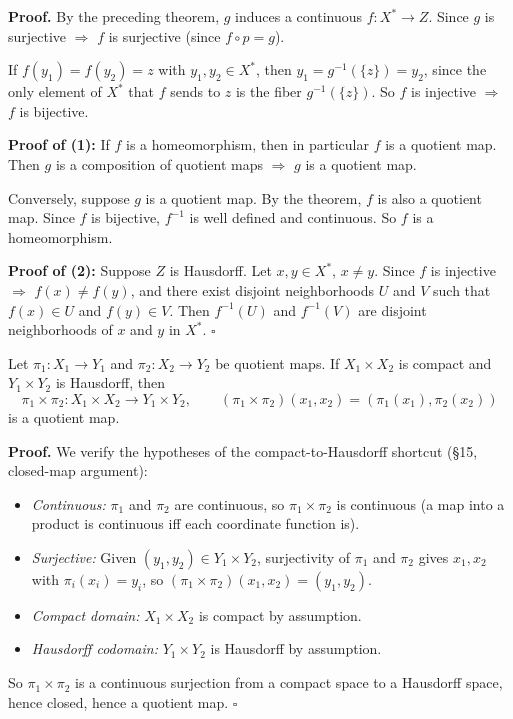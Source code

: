 \documentclass[11pt]{report}
\renewenvironment{proof}[1][Proof]{\noindent\textbf{#1.} }{\hfill$\square$\par\vspace{5pt}}
\begin{document}
\begin{proof}
By the preceding theorem, $g$ induces a continuous $f: X^* \to Z$. Since $g$ is surjective $\Rightarrow$ $f$ is surjective (since $f \circ p = g$).

If $f(y_1) = f(y_2) = z$ with $y_1, y_2 \in X^*$, then $y_1 = g^{-1}(\{z\}) = y_2$, since the only element of $X^*$ that $f$ sends to $z$ is the fiber $g^{-1}(\{z\})$. So $f$ is injective $\Rightarrow$ $f$ is bijective.

\textbf{Proof of (1):} If $f$ is a homeomorphism, then in particular $f$ is a quotient map. Then $g$ is a composition of quotient maps $\Rightarrow$ $g$ is a quotient map.

Conversely, suppose $g$ is a quotient map. By the theorem, $f$ is also a quotient map. Since $f$ is bijective, $f^{-1}$ is well defined and continuous. So $f$ is a homeomorphism.

\textbf{Proof of (2):} Suppose $Z$ is Hausdorff. Let $x, y \in X^*$, $x \neq y$. Since $f$ is injective $\Rightarrow$ $f(x) \neq f(y)$, and there exist disjoint neighborhoods $U$ and $V$ such that $f(x) \in U$ and $f(y) \in V$. Then $f^{-1}(U)$ and $f^{-1}(V)$ are disjoint neighborhoods of $x$ and $y$ in $X^*$.
\end{proof}

\begin{thmbox}
Let $\pi_1: X_1 \to Y_1$ and $\pi_2: X_2 \to Y_2$ be quotient maps. If $X_1 \times X_2$ is compact and $Y_1 \times Y_2$ is Hausdorff, then
\[\pi_1 \times \pi_2: X_1 \times X_2 \to Y_1 \times Y_2, \qquad (\pi_1 \times \pi_2)(x_1, x_2) = (\pi_1(x_1), \pi_2(x_2))\]
is a quotient map.
\end{thmbox}

\begin{proof}
We verify the hypotheses of the compact-to-Hausdorff shortcut (\S 15, closed-map argument):
\begin{itemize}[nosep]
    \item \textit{Continuous:} $\pi_1$ and $\pi_2$ are continuous, so $\pi_1 \times \pi_2$ is continuous (a map into a product is continuous iff each coordinate function is).
    \item \textit{Surjective:} Given $(y_1, y_2) \in Y_1 \times Y_2$, surjectivity of $\pi_1$ and $\pi_2$ gives $x_1, x_2$ with $\pi_i(x_i) = y_i$, so $(\pi_1 \times \pi_2)(x_1, x_2) = (y_1, y_2)$.
    \item \textit{Compact domain:} $X_1 \times X_2$ is compact by assumption.
    \item \textit{Hausdorff codomain:} $Y_1 \times Y_2$ is Hausdorff by assumption.
\end{itemize}
So $\pi_1 \times \pi_2$ is a continuous surjection from a compact space to a Hausdorff space, hence closed, hence a quotient map.
\end{proof}
\end{document}
